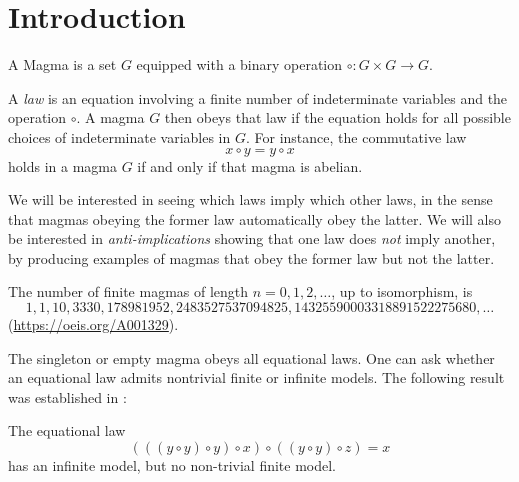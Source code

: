 \chapter{Introduction}

\begin{definition}\label{magma-def}\leanok A Magma is a set $G$ equipped with a binary operation $\circ: G \times G \to G$.
\end{definition}

A \emph{law} is an equation involving a finite number of indeterminate variables and the operation $\circ$.  A magma $G$ then obeys that law if the equation holds for all possible choices of indeterminate variables in $G$.  For instance, the commutative law
$$ x \circ y = y \circ x$$
holds in a magma $G$ if and only if that magma is abelian.

We will be interested in seeing which laws imply which other laws, in the sense that magmas obeying the former law automatically obey the latter.  We will also be interested in \emph{anti-implications} showing that one law does \emph{not} imply another, by producing examples of magmas that obey the former law but not the latter.

The number of finite magmas of length $n=0,1,2,\dots$, up to isomorphism, is
$$ 1, 1, 10, 3330, 178981952, 2483527537094825, 14325590003318891522275680, \dots$$
(\href{OEIS A001329}{https://oeis.org/A001329}).

The singleton or empty magma obeys all equational laws.  One can ask whether an equational law admits nontrivial finite or infinite models.  The following result was established in \cite{Kisielewicz}:

\begin{theorem}  The equational law
  \begin{equation}\label{biglaw}
     (((y \circ y) \circ y) \circ x) \circ ((y \circ y) \circ z) = x
  \end{equation}
has an infinite model, but no non-trivial finite model.
\end{theorem}

